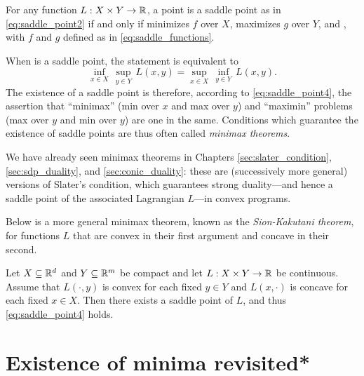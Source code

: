 \begin{Theorem}
\label{thm:saddle_point_optimality2}
For any function $L : X \times Y \to \mathbb{R}$, a point  is a saddle point as in \eqref{eq:saddle_point2} if and only if 
 minimizes $f$ over $X$,  maximizes $g$ 
over $Y$, and , with $f$ and $g$ defined as in   
\eqref{eq:saddle_functions}. 
\end{Theorem}

When  is a saddle point, the
statement  is equivalent to 
\begin{equation}
\label{eq:saddle_point4}
\inf_{x \in X} \, \sup_{y \in Y} \, L(x,y) = \sup_{x \in X} \, \inf_{y \in Y} \,
L(x,y).
\end{equation}
The existence of a saddle point is therefore, according to
\eqref{eq:saddle_point4}, the assertion that ``minimax'' (min over $x$ and max
over $y$) and ``maximin'' problems (max over $y$ and min over $y$) are one in
the same. Conditions which guarantee the existence of saddle points are
thus often called \emph{minimax theorems}. 

We have already seen minimax theorems in Chapters \ref{sec:slater_condition},
\ref{sec:sdp_duality}, and \ref{sec:conic_duality}: these are (successively more  
general) versions of Slater's condition, which guarantees strong duality---and 
hence a saddle point of the associated Lagrangian $L$---in convex programs.   

Below is a more general minimax theorem, known as the \emph{Sion-Kakutani
  theorem}, for functions $L$ that are convex in their first argument and
concave in their second.

\begin{Theorem}
Let $X \subseteq \mathbb{R}^d$ and $Y \subseteq \mathbb{R}^m$ be compact and let $L : X \times Y
\to \mathbb{R}$ be continuous. Assume that $L(\cdot,y)$ is convex for each fixed $y \in
Y$ and $L(x,\cdot)$ is concave for each fixed $x \in X$. Then there exists a
saddle point  of $L$, and thus
\eqref{eq:saddle_point4} holds. 
\end{Theorem}

\section{Existence of minima revisited*}
\label{sec:existence_minima_revisited}

